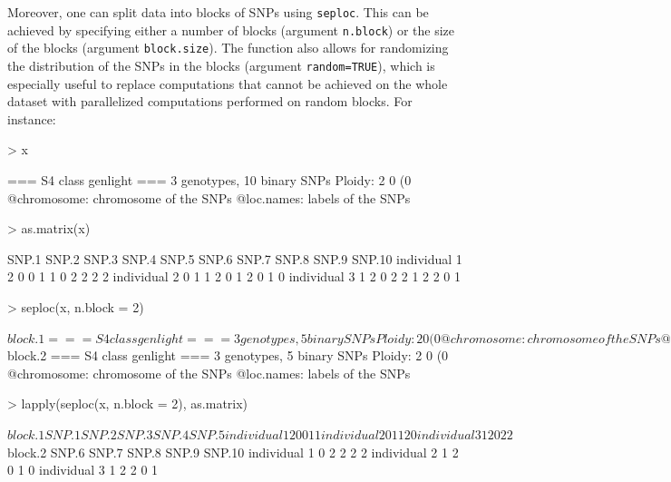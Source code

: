\documentclass{article}
\begin{document}
Moreover, one can split data into blocks of SNPs using \texttt{seploc}.
This can be achieved by specifying either a number of blocks (argument \texttt{n.block}) or the size
of the blocks (argument \texttt{block.size}). The function also allows for randomizing the
distribution of the SNPs in the blocks (argument \texttt{random=TRUE}), which is especially useful
to replace computations that cannot be achieved on the whole dataset with parallelized computations performed on random blocks.
For instance:
\begin{Schunk}
\begin{Sinput}
> x
\end{Sinput}
\begin{Soutput}
 === S4 class genlight ===
 3 genotypes,  10 binary SNPs
 Ploidy: 2
 0 (0 %
 @chromosome: chromosome of the SNPs
 @loc.names: labels of the SNPs
\end{Soutput}
\begin{Sinput}
> as.matrix(x)
\end{Sinput}
\begin{Soutput}
             SNP.1 SNP.2 SNP.3 SNP.4 SNP.5 SNP.6 SNP.7 SNP.8 SNP.9 SNP.10
individual 1     2     0     0     1     1     0     2     2     2      2
individual 2     0     1     1     2     0     1     2     0     1      0
individual 3     1     2     0     2     2     1     2     2     0      1
\end{Soutput}
\begin{Sinput}
> seploc(x, n.block = 2)
\end{Sinput}
\begin{Soutput}
$block.1
 === S4 class genlight ===
 3 genotypes,  5 binary SNPs
 Ploidy: 2
 0 (0 %
 @chromosome: chromosome of the SNPs
 @loc.names: labels of the SNPs

$block.2
 === S4 class genlight ===
 3 genotypes,  5 binary SNPs
 Ploidy: 2
 0 (0 %
 @chromosome: chromosome of the SNPs
 @loc.names: labels of the SNPs
\end{Soutput}
\begin{Sinput}
> lapply(seploc(x, n.block = 2), as.matrix)
\end{Sinput}
\begin{Soutput}
$block.1
             SNP.1 SNP.2 SNP.3 SNP.4 SNP.5
individual 1     2     0     0     1     1
individual 2     0     1     1     2     0
individual 3     1     2     0     2     2

$block.2
             SNP.6 SNP.7 SNP.8 SNP.9 SNP.10
individual 1     0     2     2     2      2
individual 2     1     2     0     1      0
individual 3     1     2     2     0      1
\end{Soutput}
\end{Schunk}
\end{document}
